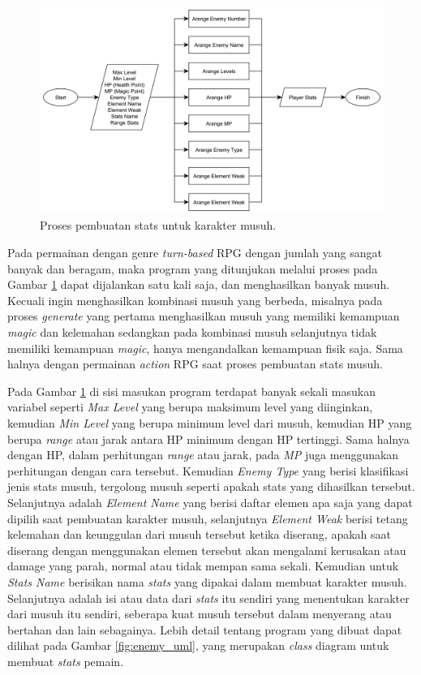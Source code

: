 \begin{figure} [!h] \centering
	\includegraphics[scale=0.06]{img/enemy_stats_generator.png}
	\caption{Proses pembuatan stats untuk karakter musuh.}
	\label{fig:enemy_stats_generator}
\end{figure}

Pada permainan dengan genre \textit{turn-based} RPG dengan jumlah yang sangat banyak dan beragam, maka program yang ditunjukan melalui proses pada Gambar \ref{fig:enemy_stats_generator} dapat dijalankan satu kali saja, dan menghasilkan banyak musuh. Kecuali ingin menghasilkan kombinasi musuh yang berbeda, misalnya pada proses \textit{generate} yang pertama menghasilkan musuh yang memiliki kemampuan \textit{magic} dan kelemahan sedangkan pada kombinasi musuh selanjutnya tidak memiliki kemampuan \textit{magic}, hanya mengandalkan kemampuan fisik saja. Sama halnya dengan permainan \textit{action} RPG saat proses pembuatan stats musuh.
\vspace{1ex}

Pada Gambar \ref{fig:enemy_stats_generator} di sisi masukan program terdapat banyak sekali masukan variabel seperti \textit{Max Level} yang berupa maksimum level yang diinginkan, kemudian \textit{Min Level} yang berupa minimum level dari musuh, kemudian HP yang berupa \textit{range} atau jarak antara HP minimum dengan HP tertinggi. Sama halnya dengan HP, dalam perhitungan \textit{range} atau jarak, pada \textit{MP} juga menggunakan perhitungan dengan cara tersebut. Kemudian \textit{Enemy Type} yang berisi klasifikasi jenis stats musuh, tergolong musuh seperti apakah stats yang dihasilkan tersebut. Selanjutnya adalah \textit{Element Name} yang berisi daftar elemen apa saja yang dapat dipilih saat pembuatan karakter musuh, selanjutnya \textit{Element Weak} berisi tetang kelemahan dan keunggulan dari musuh tersebut ketika diserang, apakah saat diserang dengan menggunakan elemen tersebut akan mengalami kerusakan atau damage yang parah, normal atau tidak mempan sama sekali. Kemudian untuk \textit{Stats Name} berisikan nama \textit{stats} yang dipakai dalam membuat karakter musuh. Selanjutnya adalah isi atau data dari \textit{stats} itu sendiri yang menentukan karakter dari musuh itu sendiri, seberapa kuat musuh tersebut dalam menyerang atau bertahan dan lain sebagainya. Lebih detail tentang program yang dibuat dapat dilihat pada Gambar \ref{fig:enemy_uml}, yang merupakan \textit{class} diagram untuk membuat \textit{stats} pemain.
\vspace{1ex}

